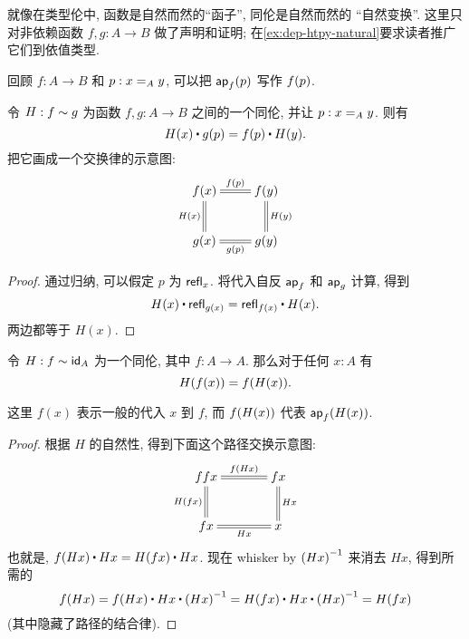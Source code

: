 %
%
就像在类型伦中, 函数是自然而然的``函子'', 同伦是自然而然的
%
``自然变换''.
这里只对非依赖函数 $f,g:A\to B$ 做了声明和证明; 在\cref{ex:dep-htpy-natural}要求读者推广它们到依值类型.

回顾 $f:A\to B$ 和 $p:\id[A]xy$, 可以把 $\apfunc{f} (p)$ 写作 $\ap f p$.

\begin{lem}
    \label{lem:htpy-natural}
    令 $H:f\htpy g$ 为函数  $f,g:A\to B$ 之间的一个同伦, 并让 $p:\id[A]xy$. 则有
    \begin{equation*}
        H(x)\ct\ap{g}{p}=\ap{f}{p}\ct H(y).
    \end{equation*}
    把它画成一个交换律的示意图:
    \begin{align*}
        \xymatrix{
            f(x) \ar@{=}[r]^{\ap fp} \ar@{=}[d]_{H(x)} & f(y) \ar@{=}[d]^{H(y)} \\
            g(x) \ar@{=}[r]_{\ap gp} & g(y)
        }
    \end{align*}
\end{lem}
\begin{proof}
    通过归纳, 可以假定 $p$ 为 $\refl x$.
    将代入自反 $\apfunc{f}$ 和 $\apfunc g$ 计算, 得到
    \[ H(x) \ct \refl{g(x)} = \refl{f(x)} \ct H(x). \]
    两边都等于 $H(x)$.
\end{proof}

\begin{cor}\label{cor:hom-fg}
  令 $H : f \htpy \idfunc[A]$ 为一个同伦, 其中 $f : A \to A$. 那么对于任何 $x : A$ 有 \[ H(f(x)) = \ap f{H(x)}. \]
\end{cor}
\noindent
这里 $f(x)$ 表示一般的代入 $x$ 到 $f$, 而 $\ap f{H(x)}$ 代表 $\apfunc{f}(H(x))$.
\begin{proof}
    根据 $H$ 的自然性, 得到下面这个路径交换示意图:
    \begin{align*}
        \xymatrix@C=3pc{
            ffx \ar@{=}[r]^-{\ap f{Hx}} \ar@{=}[d]_{H(fx)} & fx \ar@{=}[d]^{Hx} \\
            fx \ar@{=}[r]_-{Hx} & x
        }
    \end{align*}
    也就是, $\ap f{H x} \ct H x = H(f x) \ct H x$.
    现在 whisker by $\opp{(H x)}$ 来消去 $H x$, 得到所需的
    \[ \ap f{H x}
    = \ap f{H x} \ct H x \ct \opp{(H x)}
    = H(f x) \ct H x \ct \opp{(H x)}
    = H(f x)
    \]
    (其中隐藏了路径的结合律).
\end{proof}

